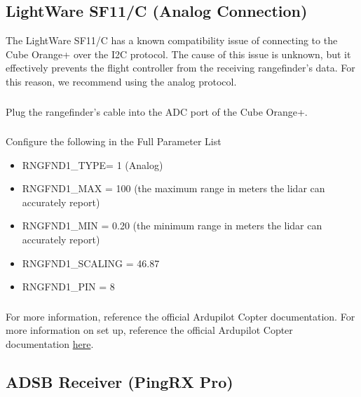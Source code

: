         \subsection{LightWare SF11/C (Analog Connection)}
            The LightWare SF11/C has a known compatibility issue of connecting to the Cube Orange+ over the I2C protocol. The cause of this issue is unknown, but it effectively prevents the flight controller from the receiving rangefinder's data. For this reason, we recommend using the analog protocol.
            
            \subsubsection{} Plug the rangefinder’s cable into the ADC port of the Cube Orange+.
            \subsubsection{} Configure the following in the Full Parameter List
                \begin{itemize}
                    \item RNGFND1\_TYPE= 1 (Analog)
                    \item RNGFND1\_MAX = 100 (the maximum range in meters the lidar can accurately report)  
                    \item RNGFND1\_MIN = 0.20 (the minimum range in meters the lidar can accurately report)  
                    \item RNGFND1\_SCALING = 46.87
                    \item RNGFND1\_PIN = 8
                \end{itemize}
            
            \subsubsection{} For more information, reference the official Ardupilot Copter documentation. 
            For more information on set up, reference the official Ardupilot Copter documentation \textcolor{blue}{\href{https://ardupilot.org/copter/docs/common-lightware-sf10-lidar.html}{here}}.         
            
        \subsection{ADSB Receiver (PingRX Pro)}
            
